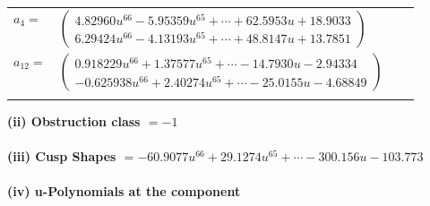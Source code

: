 \documentclass[1p]{elsarticle_modified}
\theoremstyle{definition}
\begin{document}
\begin{tabular}{m{7pt} m{180pt} m{7pt} m{180pt} }
\flushright $a_{4}=$&$\begin{pmatrix}4.82960 u^{66}-5.95359 u^{65}+\cdots+62.5953 u+18.9033\\6.29424 u^{66}-4.13193 u^{65}+\cdots+48.8147 u+13.7851\end{pmatrix}$ \\
\flushright $a_{12}=$&$\begin{pmatrix}0.918229 u^{66}+1.37577 u^{65}+\cdots-14.7930 u-2.94334\\-0.625938 u^{66}+2.40274 u^{65}+\cdots-25.0155 u-4.68849\end{pmatrix}$\\&\end{tabular}
\flushleft \textbf{(ii) Obstruction class $= -1$}\\~\\
\flushleft \textbf{(iii) Cusp Shapes $= -60.9077 u^{66}+29.1274 u^{65}+\cdots-300.156 u-103.773$}\\~\\
\newpage\renewcommand{\arraystretch}{1}
\flushleft \textbf{(iv) u-Polynomials at the component}\newline \\
\end{document}
